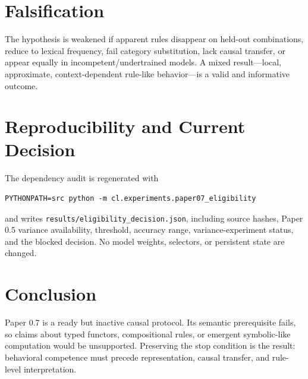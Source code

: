 \documentclass[11pt]{article}
\begin{document}
\section{Falsification}
The hypothesis is weakened if apparent rules disappear on held-out combinations, reduce to lexical frequency, fail category substitution, lack causal transfer, or appear equally in incompetent/undertrained models. A mixed result---local, approximate, context-dependent rule-like behavior---is a valid and informative outcome.

\section{Reproducibility and Current Decision}
The dependency audit is regenerated with
\begin{verbatim}
PYTHONPATH=src python -m cl.experiments.paper07_eligibility
\end{verbatim}
and writes \texttt{results/eligibility\_decision.json}, including source hashes, Paper 0.5 variance availability, threshold, accuracy range, variance-experiment status, and the blocked decision. No model weights, selectors, or persistent state are changed.

\section{Conclusion}
Paper 0.7 is a ready but inactive causal protocol. Its semantic prerequisite fails, so claims about typed functors, compositional rules, or emergent symbolic-like computation would be unsupported. Preserving the stop condition is the result: behavioral competence must precede representation, causal transfer, and rule-level interpretation.
\end{document}
